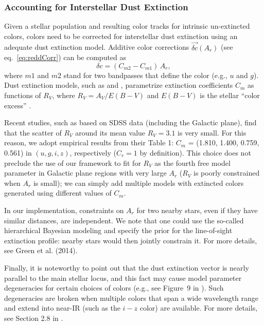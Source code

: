 \subsubsection{Accounting for Interstellar Dust Extinction \label{sec:ismdust}} 

Given a stellar population and resulting color tracks for intrinsic un-extincted colors, colors need to
be corrected for interstellar dust extinction using an adequate dust extinction model. Additive color
corrections $\vec{\delta c}(A_r)$ (see eq.~\ref{eq:reddCorr}) can be computed as 
\begin{equation}
 \label{eq:extCorr} 
                      \delta c = (C_{m2}- C_{m1}) \, A_r,
\end{equation}
where $m1$ and $m2$ stand for two bandpasses that define the color (e.g., $u$ and $g$).  
Dust extinction models, such as \cite{1989ApJ...345..245C} and
\cite{1999PASP..111...63F}, parametrize extinction coefficients $C_{m}$ as functions of $R_V$, where
$R_V = A_V/E(B-V)$ and $E(B-V)$ is the stellar ``color excess'' \citep{1989ApJ...345..245C}.

Recent studies, such as \cite{2012ApJ...757..166B} based on SDSS data (including the Galactic plane), 
find that the scatter of $R_V$ around its mean value $R_V=3.1$ is very small. For this reason, we adopt
empirical results from their Table 1: $C_m$ = (1.810, 1.400, 0.759, 0.561) in $(u, g, i, z)$, respectively ($C_r=1$
by definition). This choice does not preclude the use of our framework to fit for $R_V$ as the fourth free
model parameter in Galactic plane regions with very large $A_r$ ($R_V$ is poorly constrained when $A_r$ is small);
we  can simply add multiple models with extincted colors generated using different values of $C_m$.

In our implementation, constraints on $A_r$ for two nearby stars, even if they have similar distances,
are independent. We note that one could use the so-called hierarchical Bayesian modeling  and specify the prior
for the line-of-sight extinction profile: nearby stars would then jointly constrain it. For more
details, see Green et al. (2014).

Finally, it is noteworthy to point out that the dust extinction vector is nearly parallel to the main stellar locus,
and this fact may cause model parameter degeneracies for certain choices of colors (e.g., see Figure~9 in
\citealt{2012ApJ...757..166B}). Such degeneracies are broken when multiple colors that span a wide
wavelength range and extend into near-IR (such as the $i-z$ color) are available. For more details, see
Section 2.8 in \cite{2012ApJ...757..166B}.


